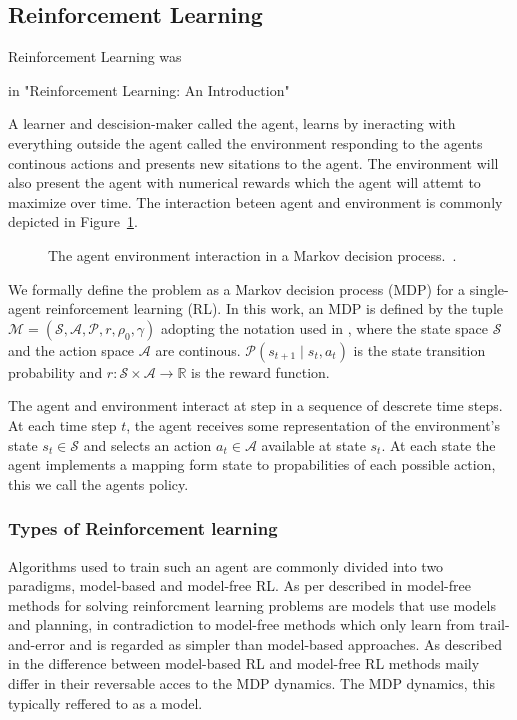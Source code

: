 \subsection{Reinforcement Learning}
Reinforcement Learning was 


in "Reinforcement Learning: An Introduction" \cite[Sec.~3.1]{sutton2018reinforcement} 


A learner and descision-maker called the agent, learns by ineracting with everything outside the agent called the environment responding to the agents continous actions and presents new sitations to the agent. The environment will also present the agent with numerical rewards which the agent will attemt to maximize over time. The interaction beteen agent and environment is commonly depicted in Figure~\ref{fig:agent-env-loop}.



\begin{figure}[htbp]
    \centering
    
    \caption{The agent environment interaction in a Markov decision process.~\cite[Fig.~3.1]{sutton2018reinforcement}.}
    \label{fig:agent-env-loop}
\end{figure}

We formally define the problem as a Markov decision process (MDP) for a single-agent reinforcement learning (RL). In this work, an MDP is defined by the tuple $\mathcal{M} = (\mathcal{S}, \mathcal{A}, \mathcal{P}, r, \rho_0, \gamma)$ adopting the notation used in \cite{song2023reaching}, where the state space $\mathcal{S}$ and the action space $\mathcal{A}$ are continous. $\mathcal{P}(s_{t+1} \mid s_t, a_t)$ is the state transition probability and $r : \mathcal{S} \times \mathcal{A} \to \mathbb{R}$ is the reward function. 


The agent and environment interact at step in a sequence of descrete time steps. At each time step $t$, the agent receives some representation of the environment's state $s_t \in \mathcal{S}$ and selects an action $a_t \in \mathcal{A}$ available at state $s_t$. At each state the agent implements a mapping form state to propabilities of each possible action, this we call the agents policy.

\subsubsection{Types of Reinforcement learning}
Algorithms used to train such an agent are commonly divided into two paradigms, model-based and model-free RL. As per described in \textcite[Sec.~1.4]{sutton2018reinforcement} model-free methods for solving reinforcment learning problems are models that use models and planning, in contradiction to model-free methods which only learn from trail-and-error and is regarded as simpler than model-based approaches. As described in \textcite{moerland2023mbrl} the difference between model-based RL and model-free RL methods maily differ in their reversable acces to the MDP dynamics. The MDP dynamics, this typically reffered to as a model. 

